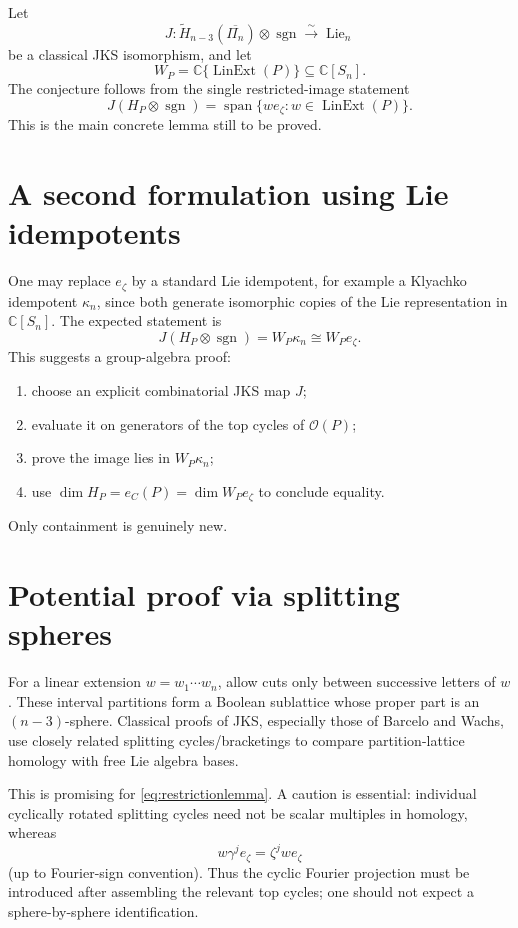 \documentclass[11pt]{article}
\newcommand{\OP}{\mathcal O}
\newcommand{\Lin}{\operatorname{LinExt}}
\newcommand{\Lie}{\operatorname{Lie}}
\newcommand{\sgn}{\operatorname{sgn}}
\begin{document}
Let
\[
J:\widetilde H_{n-3}(\overline{\Pi_n})\otimes\sgn
\stackrel{\sim}{\longrightarrow}\Lie_n
\]
be a classical JKS isomorphism, and let
\[
W_P=\mathbb C\{\Lin(P)\}\subseteq\mathbb C[S_n].
\]
The conjecture follows from the single restricted-image statement
\begin{equation}
\boxed{
J(H_P\otimes\sgn)
=\operatorname{span}\{we_\zeta:w\in\Lin(P)\}.}
\label{eq:restrictionlemma}
\end{equation}
This is the main concrete lemma still to be proved.

\section{A second formulation using Lie idempotents}
One may replace $e_\zeta$ by a standard Lie idempotent, for example a
Klyachko idempotent $\kappa_n$, since both generate isomorphic copies of the
Lie representation in $\mathbb C[S_n]$. The expected statement is
\[
J(H_P\otimes\sgn)=W_P\kappa_n\cong W_Pe_\zeta.
\]
This suggests a group-algebra proof:
\begin{enumerate}[label=\arabic*.]
\item choose an explicit combinatorial JKS map $J$;
\item evaluate it on generators of the top cycles of $\OP(P)$;
\item prove the image lies in $W_P\kappa_n$;
\item use $\dim H_P=e_C(P)=\dim W_Pe_\zeta$ to conclude equality.
\end{enumerate}
Only containment is genuinely new.

\section{Potential proof via splitting spheres}
For a linear extension $w=w_1\cdots w_n$, allow cuts only between successive
letters of $w$. These interval partitions form a Boolean sublattice whose
proper part is an $(n-3)$-sphere. Classical proofs of JKS, especially those
of Barcelo and Wachs, use closely related splitting cycles/bracketings to
compare partition-lattice homology with free Lie algebra bases.

This is promising for \eqref{eq:restrictionlemma}. A caution is essential:
individual cyclically rotated splitting cycles need not be scalar multiples
in homology, whereas
\[
w\gamma^je_\zeta=\zeta^jwe_\zeta
\]
(up to Fourier-sign convention). Thus the cyclic Fourier projection must be
introduced after assembling the relevant top cycles; one should not expect a
sphere-by-sphere identification.
\end{document}
